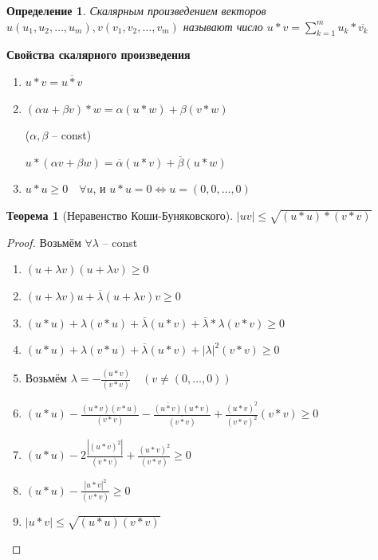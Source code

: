\documentclass[a4paper,oneside]{article}
\newtheorem{theorem}{Теорема}[subsection]
\newtheorem{definition}{Определение}[subsection]
\begin{document}
\begin{definition}
    Скалярным произведением векторов $u(u_1, u_2, \dots, u_m), v(v_1, v_2, \dots, v_m)$
    называют число $u * v = \displaystyle\sum_{k = 1}^{m} u_k * \overline{v_k}$
\end{definition}

\textbf{Свойства скалярного произведения}
\begin{enumerate}
    \item $u * v = \overline{u * v}$
    \item $(\alpha u + \beta v) * w = \alpha (u * w) + \beta (v * w)$

    ($\alpha, \beta$ -- const)

    $u * (\alpha v + \beta w) = \overline{\alpha} (u * v) + \overline{\beta} (u * w)$

    \item $u * u \ge 0 \quad \forall u$, и $u * u = 0 \Leftrightarrow u = (0,0,\dots,0)$
\end{enumerate}

\begin{theorem}[Неравенство Коши-Буняковского]
    $|u v| \le \sqrt{(u * u) * (v * v)}$    
\end{theorem}

\begin{proof}
    Возьмём $\forall \lambda $ -- const

    \begin{enumerate}
        \item $(u + \lambda v) (u + \lambda v) \ge 0$
        \item $(u + \lambda v) u + \overline{\lambda} (u + \lambda v) v \ge 0$
        \item $(u * u) + \lambda (v * u) + \overline{\lambda} (u * v) + \overline{\lambda} * \lambda (v * v) \ge 0$
        \item $(u * u) + \lambda (v * u) + \overline{\lambda} (u * v) + |\lambda|^2 (v * v) \ge 0$
        \item Возьмём $\lambda = -\frac{(u * v)}{(v * v)} \quad (v \neq (0, \dots, 0))$
        \item $(u * u) - \frac{(u * v) (v * u)}{(v * v)} - \frac{\overline{(u * v)} (u * v)}{\overline{(v * v)}}
        + \frac{(u * v)^2}{(v * v)^2} (v * v) \ge 0$
        \item $(u * u) - 2 \frac{|(u * v)^2|}{(v * v)} + \frac{(u * v)^2}{(v * v)} \ge 0$
        \item $(u * u) - \frac{|u * v|^2}{(v * v)} \ge 0$
        \item $|u * v| \le \sqrt{(u * u) (v * v)}$
    \end{enumerate}
\end{proof}
\end{document}

